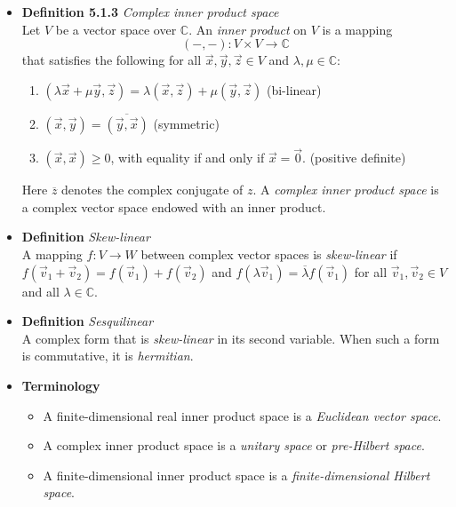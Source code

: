 \documentclass[11pt,a4paper]{article}
\begin{document}
\begin{itemize}
    \item \textbf{Definition 5.1.3} \emph{Complex inner product space} \\
        Let $V$ be a vector space over $\mathbb{C}$.
        An \emph{inner product} on $V$ is a mapping
        \[
            (-, -) : V \times V \to \mathbb{C}
        \]
        that satisfies the following for all $\vec{x}, \vec{y}, \vec{z} \in V$
        and $\lambda, \mu \in \mathbb{C}$:
        \begin{enumerate}
            \item $(\lambda \vec{x} + \mu \vec{y}, \vec{z}) =
                \lambda(\vec{x}, \vec{z}) + \mu(\vec{y}, \vec{z})$
                \quad (bi-linear)
            \item $(\vec{x}, \vec{y}) = \overline{(\vec{y}, \vec{x})}$
                \quad (symmetric)
            \item $(\vec{x}, \vec{x}) \geq 0$,
                with equality if and only if $\vec{x} = \vec{0}$.
                \quad (positive definite)
        \end{enumerate}
        Here $\overline{z}$ denotes the complex conjugate of $z$.
        A \emph{complex inner product space} is a complex vector space endowed with an inner
        product.

    \item \textbf{Definition} \emph{Skew-linear} \\
        A mapping $f : V \to W$ between complex vector spaces is \emph{skew-linear}
        if $f(\vec{v}_1 + \vec{v}_2) = f(\vec{v}_1) + f(\vec{v}_2)$
        and $f(\lambda \vec{v}_1) = \overline{\lambda} f(\vec{v}_1)$
        for all $\vec{v}_1, \vec{v}_2 \in V$ and all $\lambda \in \mathbb{C}$.

    \item \textbf{Definition} \emph{Sesquilinear} \\
        A complex form that is \emph{skew-linear} in its second variable.
        When such a form is commutative, it is \emph{hermitian}.

    \item \textbf{Terminology}
        \begin{itemize}
            \item A finite-dimensional real inner product space is a
                \emph{Euclidean vector space}.
            \item A complex inner product space is a \emph{unitary space}
                or \emph{pre-Hilbert space}.
            \item A finite-dimensional inner product space is a
                \emph{finite-dimensional Hilbert space}.
        \end{itemize}


\end{itemize}
\end{document}
